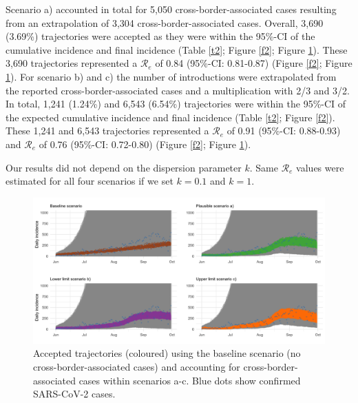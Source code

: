 \documentclass[10pt, a4paper, twoside]{article}
\begin{document}
\begin{multicols}{2}
Scenario a) accounted in total for 5,050 cross-border-associated cases resulting from an extrapolation of 3,304 cross-border-associated cases.
Overall, 3,690 (3.69\%) trajectories were accepted as they were within the 95\%-CI of the cumulative incidence and final incidence (Table \ref{t2}; Figure \ref{f2}; Figure \ref{f3}).
These 3,690 trajectories represented a $\mathcal{R}_e$ of 0.84 (95\%-CI: 0.81-0.87) (Figure \ref{f2}; Figure \ref{f3}).
For scenario b) and c) the number of introductions were extrapolated from the reported cross-border-associated cases and a multiplication with 2/3 and 3/2.
In total, 1,241 (1.24\%) and 6,543 (6.54\%) trajectories were within the 95\%-CI of the expected cumulative incidence and final incidence (Table \ref{t2}; Figure \ref{f2}).
These 1,241 and 6,543 trajectories represented a $\mathcal{R}_e$ of 0.91 (95\%-CI: 0.88-0.93) and $\mathcal{R}_e$ of 0.76 (95\%-CI: 0.72-0.80) (Figure \ref{f2}; Figure \ref{f3}).

Our results did not depend on the dispersion parameter $k$.
Same $\mathcal{R}_e$ values were estimated for all four scenarios if we set $k = 0.1$ and $k = 1$.

\begin{figure}
\centering
\includegraphics[scale=0.15]{Figure3_2021-06-02.png}
\caption{Accepted trajectories (coloured) using the baseline scenario (no cross-border-associated cases) and accounting for cross-border-associated cases within scenarios a-c. Blue dots show confirmed SARS-CoV-2 cases.}
\label{f3}
\end{figure}


\end{multicols}
\end{document}
